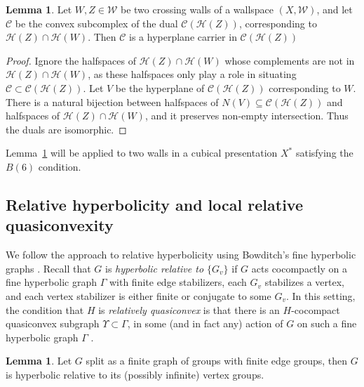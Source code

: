 \documentclass[12pt,oneside]{amsart}
\theoremstyle{definition}
\newtheorem{lem}[thm]{Lemma}
\theoremstyle{definition}
\theoremstyle{remark}
\newcommand{\C}{\mathcal{C}}
\newcommand{\Hem}{\mathcal{H}}
\begin{document}
\begin{lem}\label{lem:hyperplane carrier}
Let $W,Z\in \mathcal W$ be two crossing walls of a wallspace $(X,\mathcal W)$, and let $\C$ be the convex subcomplex of the dual $\C(\Hem(Z))$, corresponding to $\Hem(Z)\cap\Hem(W)$.
Then $\C$ is a hyperplane carrier in $\C(\Hem(Z))$
\end{lem}
\begin{proof}
Ignore the halfspaces of $\Hem(Z)\cap \Hem(W)$ whose complements are not in $\Hem(Z)\cap \Hem(W)$, as these halfspaces only play a role in situating $\C\subset \C(\Hem(Z))$. 
Let $V$ be the hyperplane of $\C(\Hem(Z))$ corresponding to $W$.
There is a natural bijection between halfspaces of $N(V)\subseteq \C(\Hem(Z))$ and halfspaces of $\Hem(Z)\cap \Hem(W)$, and it preserves non-empty intersection. Thus the duals are isomorphic.
\end{proof}

Lemma~\ref{lem:hyperplane carrier} will be applied to two walls in a cubical presentation $X^*$ satisfying  the $B(6)$ condition.





\subsection{Relative hyperbolicity and local relative quasiconvexity}\label{sec: _relative hyperbolicty}

We follow the approach to  relative hyperbolicity using Bowditch's fine  hyperbolic graphs \cite{Bowditch2012}.
Recall that $G$ is \emph{hyperbolic relative to $\{G_v\}$} if $G$ acts cocompactly on a fine hyperbolic graph $\Gamma$ with finite edge stabilizers, each $G_v$ stabilizes a vertex, and each vertex stabilizer is either finite or conjugate to some $G_v$.
In this setting, the condition that $H$ is  \emph{relatively quasiconvex} is that there is an $H$-cocompact quasiconvex subgraph $\Upsilon\subset \Gamma$, in some (and in fact any) action of $G$ on such a fine hyperbolic graph $\Gamma$ \cite{MartinezPedrozaWise2011}.


\begin{lem}\label{lem:Gsplits}
    Let $G$ split as a finite graph of groups with finite edge groups, then $G$ is hyperbolic relative to its (possibly infinite) vertex groups.
\end{lem}
\end{document}
